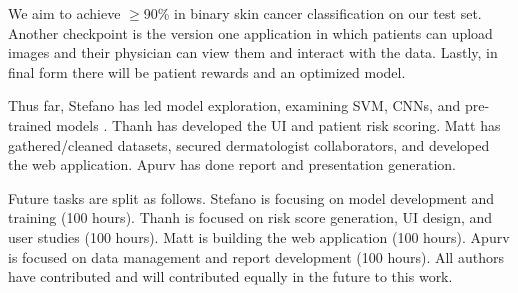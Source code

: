 \documentclass[a4paper,12pt]{article}
\begin{document}
We aim to achieve $\geq$90\% in binary skin cancer classification on our test
set. Another checkpoint is the version one application in which patients can
upload images and their physician can view them and interact with the data.
Lastly, in final form there will be patient rewards and an optimized model.

Thus far, Stefano has led model exploration, examining SVM, CNNs, and
pre-trained models \cite{razavian2014cnn}. Thanh has developed the UI and
patient risk scoring. Matt has gathered/cleaned datasets, secured dermatologist
collaborators, and developed the web application. Apurv has done report and
presentation generation.

Future tasks are split as follows. Stefano is focusing on model development and
training (100 hours). Thanh is focused on risk score generation, UI design, and
user studies (100 hours). Matt is building the web application (100 hours).
Apurv is focused on data management and report development (100 hours). All
authors have contributed and will contributed equally in the future to this
work.


\end{document}
